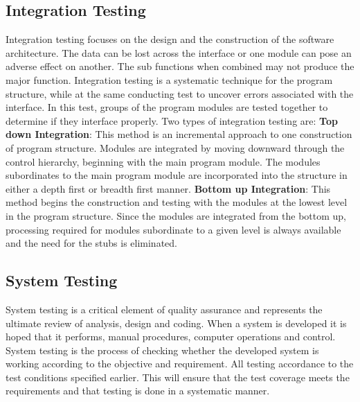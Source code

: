 \subsection*{Integration Testing}
Integration testing focuses on the design and the construction of the software architecture. The data can be lost across the interface or one module can pose an adverse effect on another. The sub functions when combined may not produce the major function. Integration testing is a systematic technique for the program structure, while at the same conducting test to uncover errors associated with the interface. In this test, groups of the program modules are tested together to determine if they interface properly. Two types of integration testing are:
\newline
\textbf{Top down Integration}: This method is an incremental approach to one construction of program structure. Modules are integrated by moving downward through the control hierarchy, beginning with the main program module. The modules subordinates to the main program module are incorporated into the structure in either a depth first or breadth first manner.
\newline
\textbf{Bottom up Integration}: This method begins the construction and testing with the modules at the lowest level in the program structure. Since the modules are integrated from the bottom up, processing required for modules subordinate to a given level is always available and the need for the stubs is eliminated.

\subsection*{System Testing}
System testing is a critical element of quality assurance and represents the ultimate review of analysis, design and coding. When a system is developed it is hoped that it performs, manual procedures, computer operations and control.
\newline
System testing is the process of checking whether the developed system is working according to the objective and requirement. All testing accordance to the test conditions specified earlier. This will ensure that the test coverage meets the requirements and that testing is done in a systematic manner. 

